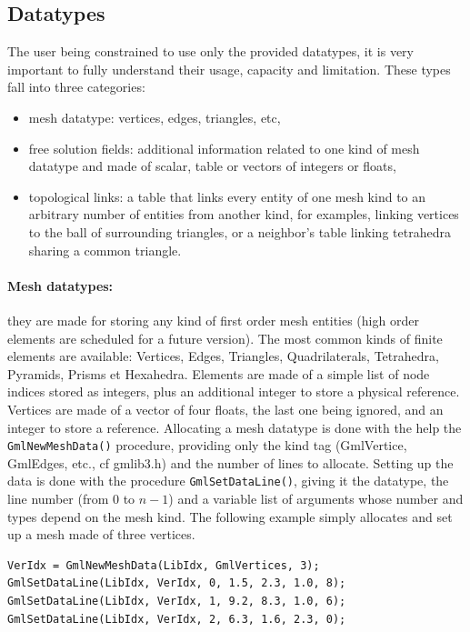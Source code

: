 \documentclass[a4paper,12pt]{article}
\begin{document}
\subsection{Datatypes}

The user being constrained to use only the provided datatypes, it is very important to fully understand their usage, capacity and limitation. These types fall into three categories:

\begin{itemize}
        \item mesh datatype: vertices, edges, triangles, etc,
        \item free solution fields: additional information related to one kind of mesh datatype and made of scalar, table or vectors of integers or floats,
        \item topological links: a table that links every entity of one mesh kind to an arbitrary number of entities from another kind, for examples, linking vertices to the ball of surrounding triangles, or a neighbor’s table linking tetrahedra sharing a common triangle.
\end{itemize}

\paragraph{Mesh datatypes:} they are made for storing any kind of first order mesh entities (high order elements are scheduled for a future version). The most common kinds of finite elements are available: Vertices, Edges, Triangles, Quadrilaterals, Tetrahedra, Pyramids, Prisms et Hexahedra. Elements are made of a simple list of node indices stored as integers, plus an additional integer to store a physical reference. Vertices are made of a vector of four floats, the last one being ignored, and an integer to store a reference. Allocating a mesh datatype is done with the help the {\tt GmlNewMeshData()} procedure, providing only the kind tag (GmlVertice, GmlEdges, etc., cf gmlib3.h) and the number of lines to allocate. Setting up the data is done with the procedure {\tt GmlSetDataLine()}, giving it the datatype, the line number (from $0$ to $n-1$) and a variable list of arguments whose number and types depend on the mesh kind. The following example simply allocates and set up a mesh made of three vertices.

\begin{tt}
\begin{verbatim}
VerIdx = GmlNewMeshData(LibIdx, GmlVertices, 3);
GmlSetDataLine(LibIdx, VerIdx, 0, 1.5, 2.3, 1.0, 8);
GmlSetDataLine(LibIdx, VerIdx, 1, 9.2, 8.3, 1.0, 6);
GmlSetDataLine(LibIdx, VerIdx, 2, 6.3, 1.6, 2.3, 0);
\end{verbatim}
\end{tt}
\normalfont
\end{document}
